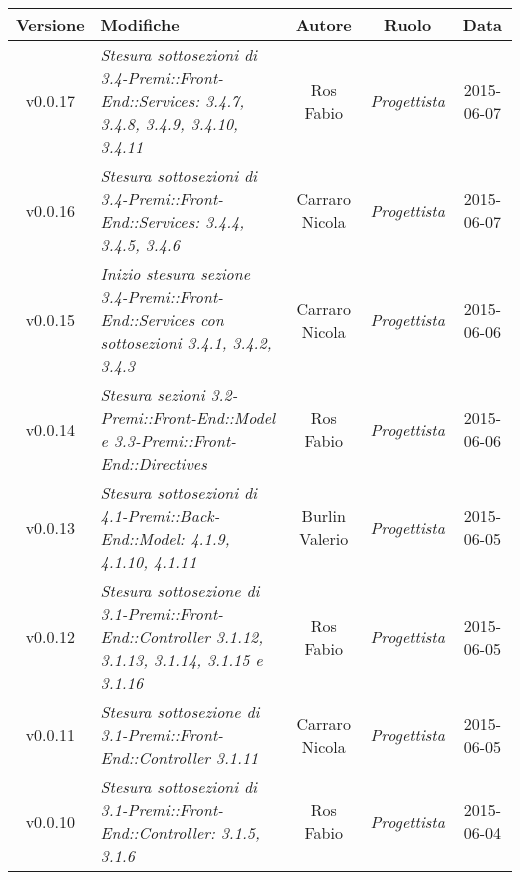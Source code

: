 \begin{table}[h]
	\centering
	\begin{tabular}{|c|p{}|c|c|c|}
		\toprule
			\textbf{Versione} & \textbf{Modifiche} & \textbf{Autore} & \textbf{Ruolo} & \textbf{Data}\\
		\midrule
		\midrule
			v0.0.17 & \textit{Stesura sottosezioni di 3.4-Premi::Front-End::Services: 3.4.7, 3.4.8, 3.4.9, 3.4.10, 3.4.11} & Ros Fabio & \textit{Progettista} & 2015-06-07\\
		\midrule
			v0.0.16 & \textit{Stesura sottosezioni di 3.4-Premi::Front-End::Services: 3.4.4, 3.4.5, 3.4.6} & Carraro Nicola & \textit{Progettista} & 2015-06-07\\
		\midrule
			v0.0.15 & \textit{Inizio stesura sezione 3.4-Premi::Front-End::Services con sottosezioni 3.4.1, 3.4.2, 3.4.3} & Carraro Nicola & \textit{Progettista} & 2015-06-06\\
		\midrule
			v0.0.14 & \textit{Stesura sezioni 3.2-Premi::Front-End::Model e 3.3-Premi::Front-End::Directives} & Ros Fabio & \textit{Progettista} & 2015-06-06\\
		\midrule
			v0.0.13 & \textit{Stesura sottosezioni di 4.1-Premi::Back-End::Model: 4.1.9, 4.1.10, 4.1.11} & Burlin Valerio & \textit{Progettista} & 2015-06-05\\
		\midrule
			v0.0.12 & \textit{Stesura sottosezione di 3.1-Premi::Front-End::Controller 3.1.12, 3.1.13, 3.1.14, 3.1.15 e 3.1.16} & Ros Fabio & \textit{Progettista} & 2015-06-05\\
		\midrule
			v0.0.11 & \textit{Stesura sottosezione di 3.1-Premi::Front-End::Controller 3.1.11} & Carraro Nicola & \textit{Progettista} & 2015-06-05\\
		\midrule
			v0.0.10 & \textit{Stesura sottosezioni di 3.1-Premi::Front-End::Controller: 3.1.5, 3.1.6} & Ros Fabio & \textit{Progettista} & 2015-06-04\\
		\bottomrule
\end{tabular}
\end{table}

\newpage

